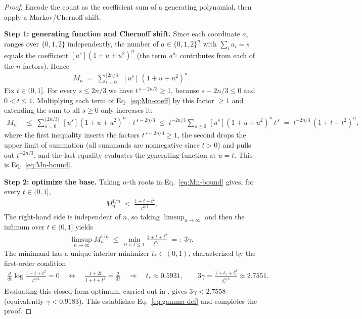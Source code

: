 \begin{proof}
Encode the count as the coefficient sum of a generating polynomial, then apply a
Markov/Chernoff shift.

\smallskip\noindent
\textbf{Step 1: generating function and Chernoff shift.}
Since each coordinate $a_i$ ranges over $\{0,1,2\}$ independently, the number of
$a\in\{0,1,2\}^n$ with $\sum_i a_i=s$ equals the coefficient
$[u^s](1+u+u^2)^n$ (the term $u^{a_i}$ contributes from each of the $n$ factors).
Hence
\begin{align}\label{eq:Mn-coeff}
M_n\;=\;\sum_{s=0}^{\lfloor 2n/3\rfloor}\,[u^s]\,(1+u+u^2)^n.
\end{align}
Fix $t\in(0,1]$. For every $s\le 2n/3$ we have $t^{\,s-2n/3}\ge 1$, because
$s-2n/3\le 0$ and $0<t\le 1$. Multiplying each term of Eq.~\eqref{eq:Mn-coeff} by this
factor $\ge 1$ and extending the sum to all $s\ge 0$ only increases it:
\begin{align*}
M_n
&\;\le\;\sum_{s=0}^{\lfloor 2n/3\rfloor}\,[u^s](1+u+u^2)^n\,\cdot\,t^{\,s-2n/3}
\;\le\;t^{-2n/3}\sum_{s\ge 0}\,[u^s](1+u+u^2)^n\,t^{\,s}
\;=\;t^{-2n/3}\,(1+t+t^2)^n,
\end{align*}
where the first inequality inserts the factors $t^{\,s-2n/3}\ge 1$, the second drops
the upper limit of summation (all summands are nonnegative since $t>0$) and pulls out
$t^{-2n/3}$, and the last equality evaluates the generating function at $u=t$. This
is Eq.~\eqref{eq:Mn-bound}.

\smallskip\noindent
\textbf{Step 2: optimize the base.}
Taking $n$-th roots in Eq.~\eqref{eq:Mn-bound} gives, for every $t\in(0,1]$,
\begin{align*}
M_n^{1/n}\;\le\;\frac{1+t+t^2}{t^{2/3}}.
\end{align*}
The right-hand side is independent of $n$, so taking $\limsup_{n\to\infty}$ and then
the infimum over $t\in(0,1]$ yields
\begin{align*}
\limsup_{n\to\infty}M_n^{1/n}\;\le\;\min_{0<t\le1}\frac{1+t+t^2}{t^{2/3}}\;=:\;3\gamma.
\end{align*}
The minimand has a unique interior minimizer $t_\ast\in(0,1)$, characterized by the
first-order condition
\begin{align*}
\frac{d}{dt}\log\frac{1+t+t^2}{t^{2/3}}=0
\quad\Longleftrightarrow\quad
\frac{1+2t}{1+t+t^2}=\frac{2}{3t}
\quad\Longrightarrow\quad
t_\ast\approx 0.5931,\qquad 3\gamma=\frac{1+t_\ast+t_\ast^2}{t_\ast^{2/3}}\approx 2.7551.
\end{align*}
Evaluating this closed-form optimum, carried out in \cite{ellenberggijswijt2017},
gives $3\gamma<2.7558$ (equivalently $\gamma<0.9183$). This establishes
Eq.~\eqref{eq:gamma-def} and completes the proof.
\end{proof}

